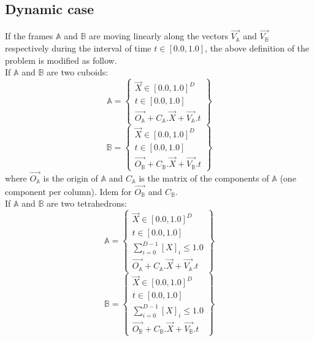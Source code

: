 \documentclass[12pt, a4paper]{article}
\begin{document}
\subsection{Dynamic case}

If the frames $\mathbb{A}$ and $\mathbb{B}$ are moving linearly along the vectors $\overrightarrow{V_\mathbb{A}}$ and $\overrightarrow{V_\mathbb{B}}$ respectively during the interval of time $t\in[0.0,1.0]$, the above definition of the problem is modified as follow.\\

If $\mathbb{A}$ and $\mathbb{B}$ are two cuboids:
\begin{equation}
\mathbb{A}=\left\lbrace
\begin{array}{c}
\overrightarrow{X}\in[0.0,1.0]^D\\
t\in[0.0,1.0]\\
\overrightarrow{O_\mathbb{A}}+C_\mathbb{A}.\overrightarrow{X}+\overrightarrow{V_\mathbb{A}}.t
\end{array}
\right\rbrace
\end{equation}
\begin{equation}
\mathbb{B}=\left\lbrace
\begin{array}{c}
\overrightarrow{X}\in[0.0,1.0]^D\\
t\in[0.0,1.0]\\
\overrightarrow{O_\mathbb{B}}+C_\mathbb{B}.\overrightarrow{X}+\overrightarrow{V_\mathbb{B}}.t
\end{array}
\right\rbrace
\end{equation}
where $\overrightarrow{O_\mathbb{A}}$ is the origin of $\mathbb{A}$ and $C_\mathbb{A}$ is the matrix of the components of $\mathbb{A}$ (one component per column). Idem for $\overrightarrow{O_\mathbb{B}}$ and $C_\mathbb{B}$.\\

If $\mathbb{A}$ and $\mathbb{B}$ are two tetrahedrons:
\begin{equation}
\mathbb{A}=\left\lbrace
\begin{array}{c}
\overrightarrow{X}\in[0.0,1.0]^D\\
t\in[0.0,1.0]\\
\sum_{i=0}^{D-1}\left[X\right]_i\le1.0\\
\overrightarrow{O_\mathbb{A}}+C_\mathbb{A}.\overrightarrow{X}+\overrightarrow{V_\mathbb{A}}.t
\end{array}
\right\rbrace
\end{equation}
\begin{equation}
\mathbb{B}=\left\lbrace
\begin{array}{c}
\overrightarrow{X}\in[0.0,1.0]^D\\
t\in[0.0,1.0]\\
\sum_{i=0}^{D-1}\left[X\right]_i\le1.0\\
\overrightarrow{O_\mathbb{B}}+C_\mathbb{B}.\overrightarrow{X}+\overrightarrow{V_\mathbb{B}}.t
\end{array}
\right\rbrace
\end{equation}
\end{document}
